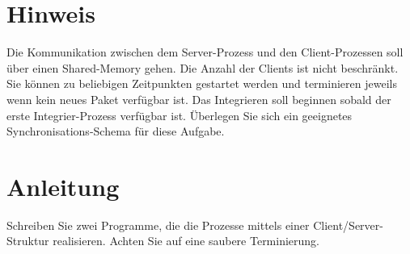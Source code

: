 \section*{Hinweis}
Die Kommunikation zwischen dem Server-Prozess und den Client-Prozessen soll über einen Shared-Memory gehen. Die Anzahl der Clients ist nicht beschränkt. Sie können zu beliebigen Zeitpunkten gestartet werden und terminieren jeweils wenn kein neues Paket verfügbar ist. Das Integrieren soll beginnen sobald der erste Integrier-Prozess verfügbar ist. Überlegen Sie sich ein geeignetes Synchronisations-Schema für diese Aufgabe.  

\section*{Anleitung}
Schreiben Sie zwei Programme, die die Prozesse mittels einer Client/Server-Struktur realisieren. Achten Sie auf eine saubere Terminierung.

\osueguidelinesthree


